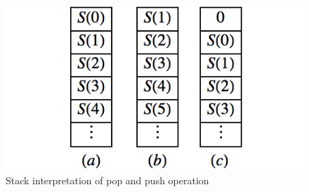 \documentclass[10pt,]{book}
\theoremstyle{plain}
\theoremstyle{definition}
\theoremstyle{definition}
\theoremstyle{definition}
\theoremstyle{definition}
\numberwithin{equation}{section}
\begin{document}
\leavevmode%
\begin{figure}
\centering
\includegraphics[width=1\linewidth]{images/fig-pop-push.png}
\caption{Stack interpretation of pop and push operation\label{fig-pop-push}}
\end{figure}
\end{document}
